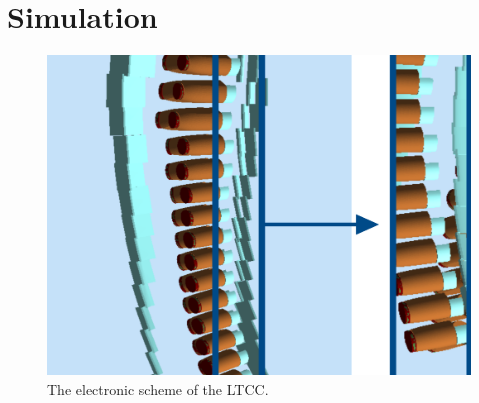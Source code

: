 \section{Simulation}


\begin{figure}
	\centering
	\includegraphics[width=0.95\columnwidth,keepaspectratio]{img/sim1.png}
	\caption{The electronic scheme of the LTCC.}
	\label{fig:readout}
\end{figure}

